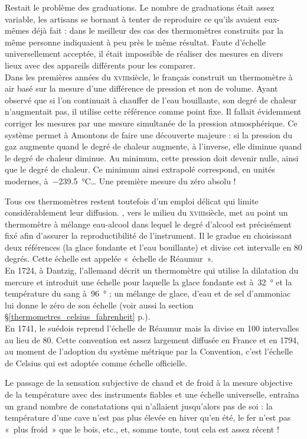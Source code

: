 	Restait le problème des graduations. Le nombre de graduations était assez variable, les artisans se bornant à tenter de reproduire ce qu'ils avaient eux-mêmes déjà fait : dans le meilleur des cas des thermomètres construits par la même personne indiquaient à peu près le même résultat. Faute d'échelle universellement acceptée, il était impossible de réaliser des mesures en divers lieux avec des appareils différents pour les comparer.\\
	Dans les premières années du \textsc{xviii}\ieme siècle, le français  construit un thermomètre à air basé sur la mesure d'une différence de pression et non de volume. Ayant observé que si l'on continuait à chauffer de l'eau bouillante, son degré de chaleur n'augmentait pas, il utilise cette référence comme point fixe. Il fallait évidemment corriger les mesures par une mesure simultanée de la pression atmosphérique. Ce système permet à Amontons de faire une découverte majeure : si la pression du gaz augmente quand le degré de chaleur augmente, à l'inverse, elle diminue quand le degré de chaleur diminue. Au minimum, cette pression doit devenir nulle, ainsi que le degré de chaleur. Ce minimum ainsi extrapolé correspond, en unités modernes, à~\SI{-239,5}{\degreeCelsius}… Une première mesure du zéro absolu !
	
	Tous ces thermomètres restent toutefois d'un emploi délicat qui limite considérablement leur diffusion. , vers le milieu du \textsc{xviii}\ieme siècle, met au point un thermomètre à mélange eau-alcool dans lequel le degré d'alcool est précisément fixé afin d'assurer la reproductibilité de l'instrument. Il le gradue en choisissant deux références (la glace fondante et l'eau bouillante) et divise cet intervalle en 80 degrés. Cette échelle est appelée «~échelle de Réaumur~».\\	
	En 1724, à Dantzig, l’allemand  décrit un thermomètre qui utilise la dilatation du mercure et introduit une échelle pour laquelle la glace fondante est à~\SI{32}{\degree} et la température du sang à~\SI{96}{\degree} ; un mélange de glace, d'eau et de sel d'ammoniac lui donne le zéro de son échelle (voir aussi la section \S\ref{thermometres_celsius_fahrenheit} p.\pageref{thermometres_celsius_fahrenheit}).\\	
	En 1741, le suédois  reprend l'échelle de Réaumur mais la divise en 100 intervalles au lieu de 80. Cette convention est assez largement diffusée en France et en 1794, au moment de l'adoption du système métrique par la Convention, c'est l'échelle de Celsius qui est adoptée comme échelle officielle.

	Le passage de la sensation subjective de chaud et de froid à la mesure objective de la température avec des instruments fiables et une échelle universelle, entraîna un grand nombre de constatations qui n'allaient jusqu'alors pas de soi : la température d'une cave n'est pas plus élevée en hiver qu'en été, le fer n'est pas «~plus froid~» que le bois, etc., et, somme toute, tout cela est assez récent !

\atendofhistorysection

